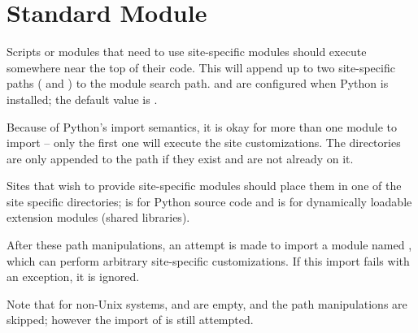\section{Standard Module }
\label{module-site}

Scripts or modules that need to use site-specific modules should
execute  somewhere near the top of their code.  This
will append up to two site-specific paths ( and
) to the module search path. 
 and  are configured when Python is installed; the default value is .   

Because of Python's import semantics, it is okay for more than one
module to import  -- only the first one will execute the
site customizations.  The directories are only appended to the path if
they exist and are not already on it.

Sites that wish to provide site-specific modules should place them in
one of the site specific directories;  is for Python source code and
 is for dynamically
loadable extension modules (shared libraries).

After these path manipulations, an attempt is made to import a module
named , which can perform arbitrary site-specific
customizations.  If this import fails with an 
exception, it is ignored.

Note that for non-Unix systems,  and
 are empty, and the path manipulations are
skipped; however the import of  is still attempted.
